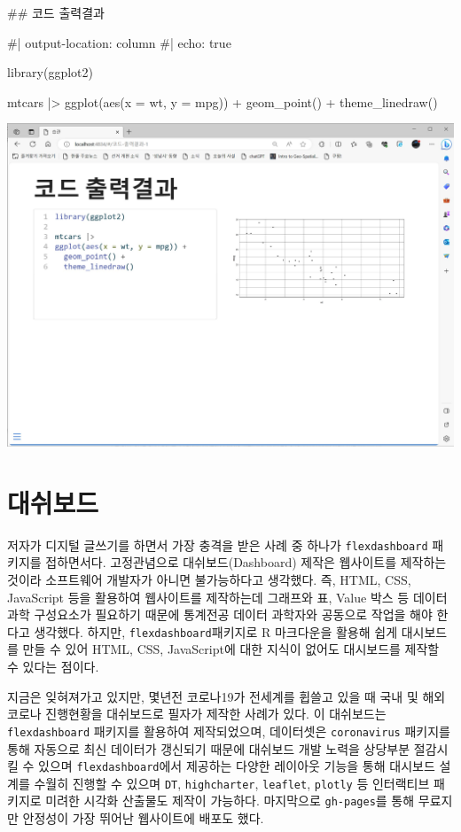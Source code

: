 \documentclass[
  letterpaper,
]{book}
\newenvironment{Shaded}{\begin{snugshade}}{\end{snugshade}}
\newcommand{\FunctionTok}[1]{\textcolor[rgb]{0.28,0.35,0.67}{#1}}
\newcommand{\NormalTok}[1]{\textcolor[rgb]{0.00,0.23,0.31}{#1}}
\begin{document}
\begin{Shaded}
\begin{Highlighting}[]
\FunctionTok{\#\# 코드 출력결과}

\NormalTok{\#| output{-}location: column}
\NormalTok{\#| echo: true}

\NormalTok{library(ggplot2)}

\NormalTok{mtcars |\textgreater{} }
\NormalTok{ggplot(aes(x = wt, y = mpg)) +}
\NormalTok{  geom\_point() +}
\NormalTok{  theme\_linedraw()}
\end{Highlighting}
\end{Shaded}

\includegraphics{images/revealjs_code.jpg}

\hypertarget{uxb300uxc26cuxbcf4uxb4dc}{%
\chapter{대쉬보드}\label{uxb300uxc26cuxbcf4uxb4dc}}

저자가 디지털 글쓰기를 하면서 가장 충격을 받은 사례 중 하나가
\texttt{flexdashboard} 패키지를 접하면서다. 고정관념으로
대쉬보드(Dashboard) 제작은 웹사이트를 제작하는 것이라 소프트웨어
개발자가 아니면 불가능하다고 생각했다. 즉, HTML, CSS, JavaScript 등을
활용하여 웹사이트를 제작하는데 그래프와 표, Value 박스 등 데이터 과학
구성요소가 필요하기 때문에 통계전공 데이터 과학자와 공동으로 작업을 해야
한다고 생각했다. 하지만, \texttt{flexdashboard}패키지로 R 마크다운을
활용해 쉽게 대시보드를 만들 수 있어 HTML, CSS, JavaScript에 대한 지식이
없어도 대시보드를 제작할 수 있다는 점이다.

지금은 잊혀져가고 있지만, 몇년전 코로나19가 전세계를 휩쓸고 있을 때 국내
및 해외 코로나 진행현황을 대쉬보드로 필자가 제작한 사례가 있다. 이
대쉬보드는 \texttt{flexdashboard} 패키지를 활용하여 제작되었으며,
데이터셋은 \texttt{coronavirus} 패키지를 통해 자동으로 최신 데이터가
갱신되기 때문에 대쉬보드 개발 노력을 상당부분 절감시킬 수 있으며
\texttt{flexdashboard}에서 제공하는 다양한 레이아웃 기능을 통해 대시보드
설계를 수월히 진행할 수 있으며 \texttt{DT}, \texttt{highcharter},
\texttt{leaflet}, \texttt{plotly} 등 인터랙티브 패키지로 미려한 시각화
산출물도 제작이 가능하다. 마지막으로 \texttt{gh-pages}를 통해 무료지만
안정성이 가장 뛰어난 웹사이트에 배포도 했다.
\end{document}
